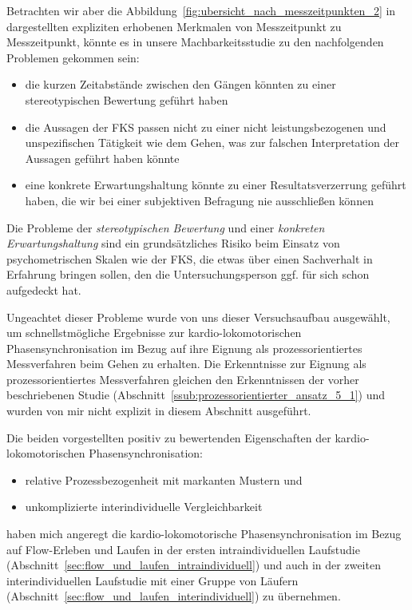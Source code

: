 Betrachten wir aber die Abbildung~\ref{fig:ubersicht_nach_messzeitpunkten_2} in dargestellten expliziten erhobenen Merkmalen von Messzeitpunkt zu Messzeitpunkt, könnte es in unsere Machbarkeitsstudie zu den nachfolgenden Problemen gekommen sein: 
\begin{itemize}
	
	\item die kurzen Zeitabstände zwischen den Gängen könnten zu einer stereotypischen Bewertung geführt haben
	
	\item die Aussagen der \ac{FKS} passen nicht zu einer nicht leistungsbezogenen und unspezifischen Tätigkeit wie dem Gehen, was zur falschen Interpretation der Aussagen geführt haben könnte
	
	\item eine konkrete Erwartungshaltung könnte zu einer Resultatsverzerrung geführt haben, die wir bei einer subjektiven Befragung nie ausschließen können 
\end{itemize}

Die Probleme der \emph{stereotypischen Bewertung} und einer \emph{konkreten Erwartungshaltung} sind ein grundsätzliches Risiko beim Einsatz von psychometrischen Skalen wie der \ac{FKS}, die etwas über einen Sachverhalt in Erfahrung bringen sollen, den die Untersuchungsperson ggf. für sich schon aufgedeckt hat.

Ungeachtet dieser Probleme wurde von uns dieser Versuchsaufbau ausgewählt, um schnellstmögliche Ergebnisse zur kardio-lokomotorischen Phasensynchronisation im Bezug auf ihre Eignung als prozessorientiertes Messverfahren beim Gehen zu erhalten. Die Erkenntnisse zur Eignung als prozessorientiertes Messverfahren gleichen den Erkenntnissen der vorher beschriebenen Studie (Abschnitt~\ref{ssub:prozessorientierter_ansatz_5_1}) und wurden von mir nicht explizit in diesem Abschnitt ausgeführt.

Die beiden vorgestellten positiv zu bewertenden Eigenschaften der kardio-lokomotorischen Phasensynchronisation: 
\begin{itemize}
	
	\item relative Prozessbezogenheit mit markanten Mustern und
	
	\item unkomplizierte interindividuelle Vergleichbarkeit 
\end{itemize}

haben mich angeregt die kardio-lokomotorische Phasensynchronisation im Bezug auf Flow-Erleben und Laufen in der ersten intraindividuellen Laufstudie (Abschnitt~\ref{sec:flow_und_laufen_intraindividuell}) und auch in der zweiten interindividuellen Laufstudie mit einer Gruppe von Läufern (Abschnitt~\ref{sec:flow_und_laufen_interindividuell}) zu übernehmen.


